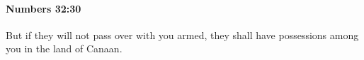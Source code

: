 
		\paragraph{Numbers 32:30} %
			\label{NUMBERS-32-30}

			But if they will not pass over with you armed, they shall have possessions among you in the land of Canaan.


